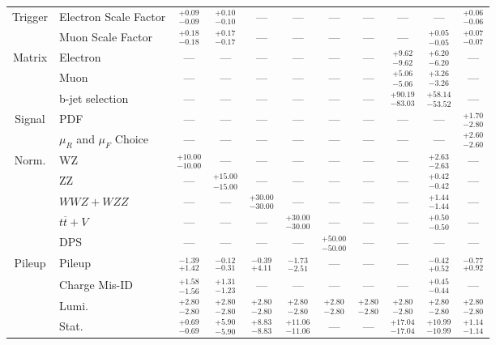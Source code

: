 \begin{tabular}{|cl||ccccccc|c||c|}
\hline
\multirow{2}{*}{Trigger}
&Electron Scale Factor &  $^{+0.09}_{-0.09}$  &  $^{+0.10}_{-0.10}$  & --- & --- & --- & --- & --- & --- &  $^{+0.06}_{-0.06}$ \\ 
\cline{2-11}
&Muon Scale Factor &  $^{+0.18}_{-0.18}$  &  $^{+0.17}_{-0.17}$  & --- & --- & --- & --- & --- &  $^{+0.05}_{-0.05}$  &  $^{+0.07}_{-0.07}$ \\ 
\hline
\multirow{2}{*}{Matrix}
&Electron & --- & --- & --- & --- & --- & --- &  $^{+9.62}_{-9.62}$  &  $^{+6.20}_{-6.20}$  & ---\\ 
\cline{2-11}
\multirow{2}{*}{Method}
&Muon & --- & --- & --- & --- & --- & --- &  $^{+5.06}_{-5.06}$  &  $^{+3.26}_{-3.26}$  & ---\\ 
\cline{2-11}
&b-jet selection & --- & --- & --- & --- & --- & --- &  $^{+90.19}_{-83.03}$  &  $^{+58.14}_{-53.52}$  & ---\\ 
\hline
\multirow{2}{*}{Signal}
&PDF & --- & --- & --- & --- & --- & --- & --- & --- &  $^{+1.70}_{-2.80}$ \\ 
\cline{2-11}
&$\mu_{R}$ and $\mu_{F}$ Choice & --- & --- & --- & --- & --- & --- & --- & --- &  $^{+2.60}_{-2.60}$ \\ 
\hline
\multirow{5}{*}{Norm.}
&WZ &  $^{+10.00}_{-10.00}$  & --- & --- & --- & --- & --- & --- &  $^{+2.63}_{-2.63}$  & ---\\ 
\cline{2-11}
&ZZ & --- &  $^{+15.00}_{-15.00}$  & --- & --- & --- & --- & --- &  $^{+0.42}_{-0.42}$  & ---\\ 
\cline{2-11}
&$WWZ+WZZ$ & --- & --- &  $^{+30.00}_{-30.00}$  & --- & --- & --- & --- &  $^{+1.44}_{-1.44}$  & ---\\ 
\cline{2-11}
&$t\overline{t}+V$ & --- & --- & --- &  $^{+30.00}_{-30.00}$  & --- & --- & --- &  $^{+0.50}_{-0.50}$  & ---\\ 
\cline{2-11}
&DPS & --- & --- & --- & --- &  $^{+50.00}_{-50.00}$  & --- & --- & --- & ---\\ 
\hline
\multirow{1}{*}{Pileup}
&Pileup &  $^{-1.39}_{+1.42}$  &  $^{-0.12}_{-0.31}$  &  $^{-0.39}_{+4.11}$  &  $^{-1.73}_{-2.51}$  & --- & --- & --- &  $^{-0.42}_{+0.52}$  &  $^{-0.77}_{+0.92}$ \\ 
\hline
&Charge Mis-ID &  $^{+1.58}_{-1.56}$  &  $^{+1.31}_{-1.23}$  & --- & --- & --- & --- & --- &  $^{+0.45}_{-0.44}$  & ---\\ 
\hline
&Lumi. &  $^{+2.80}_{-2.80}$  &  $^{+2.80}_{-2.80}$  &  $^{+2.80}_{-2.80}$  &  $^{+2.80}_{-2.80}$  &  $^{+2.80}_{-2.80}$  &  $^{+2.80}_{-2.80}$  &  $^{+2.80}_{-2.80}$  &  $^{+2.80}_{-2.80}$  &  $^{+2.80}_{-2.80}$ \\ 
\hline
&Stat. &  $^{+0.69}_{-0.69}$  &  $^{+5.90}_{-5.90}$  &  $^{+8.83}_{-8.83}$  &  $^{+11.06}_{-11.06}$  & --- & --- &  $^{+17.04}_{-17.04}$  &  $^{+10.99}_{-10.99}$  &  $^{+1.14}_{-1.14}$ \\ 
\hline
\hline
\hline
\end{tabular}
